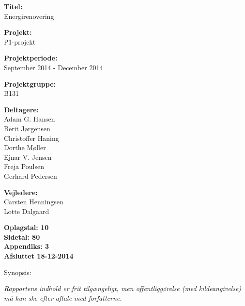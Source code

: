 \begin{minipage}[t]{0.48\textwidth}
\textbf{Titel:} \\[5pt]\bigskip\hspace{2ex}
Energirenovering

\textbf{Projekt:} \\[5pt]\bigskip\hspace{2ex}
P1-projekt

\textbf{Projektperiode:} \\[5pt]\bigskip\hspace{2ex}
September 2014 - December 2014

\textbf{Projektgruppe:} \\[5pt]\bigskip\hspace{2ex}
B131	

\textbf{Deltagere:} \\[5pt]\hspace*{2ex}
Adam  G. Hansen \\\hspace*{2ex}
Berit Jørgensen \\\hspace*{2ex}
Christoffer Haning \\\hspace*{2ex}
Dorthe Møller \\\hspace*{2ex}
Ejnar V. Jensen \\\hspace*{2ex}
Freja Poulsen \\\bigskip\hspace{2ex}
Gerhard Pedersen

\textbf{Vejledere:} \\[5pt]\hspace*{2ex}
Carsten Henningsen \\\bigskip\hspace{2ex}
Lotte Dalgaard

\vspace*{1cm}

\textbf{Oplagstal: 10} \\
\textbf{Sidetal: 80} \\
\textbf{Appendiks: 3} \\ 
\textbf{Afsluttet 18-12-2014}

\end{minipage}
\hfill
\begin{minipage}[t]{0.483\textwidth}
Synopsis: \\[5pt]
\fbox{\parbox{7cm}{\bigskip\bigskip}}
\end{minipage}

\vfill

{\footnotesize\itshape Rapportens indhold er frit tilgængeligt, men offentliggørelse (med kildeangivelse) må kun ske efter aftale med forfatterne.}

